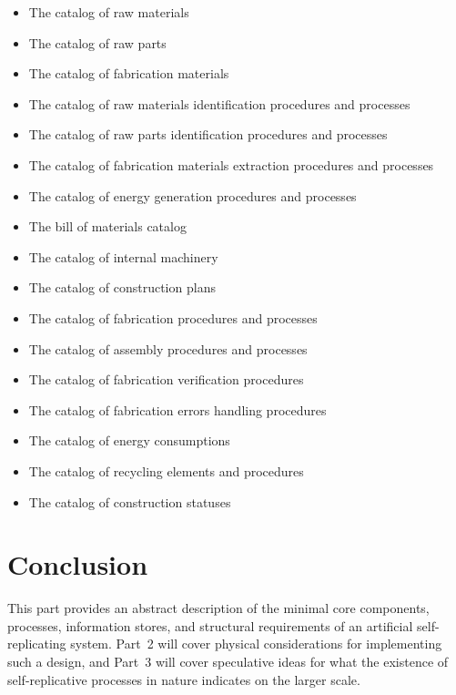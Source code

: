 \begin{itemize}
\item The catalog of raw materials
\item The catalog of raw parts
\item The catalog of fabrication materials
\item The catalog of raw materials identification procedures and
processes
\item The catalog of raw parts identification procedures and processes
\item The catalog of fabrication materials extraction procedures and
processes
\item The catalog of energy generation procedures and processes
\item The bill of materials catalog
\item The catalog of internal machinery
\item The catalog of construction plans
\item The catalog of fabrication procedures and processes
\item The catalog of assembly procedures and processes
\item The catalog of fabrication verification procedures
\item The catalog of fabrication errors handling procedures
\item The catalog of energy consumptions
\item The catalog of recycling elements and procedures
\item The catalog of construction statuses
\end{itemize}

\section{Conclusion}

This part provides an abstract description of the minimal core components,
processes, information stores, and structural requirements of an artificial 
self-replicating system.  Part~2 will cover physical considerations for
implementing such a design, and Part~3 will cover speculative ideas for
what the existence of self-replicative processes in nature indicates on the
larger scale.
